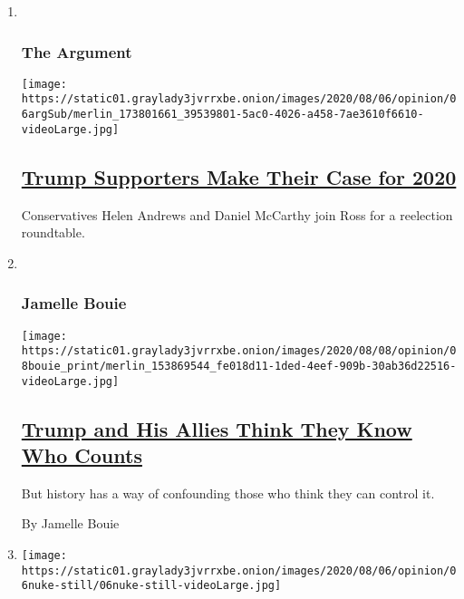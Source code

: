 \begin{enumerate}
\def\labelenumi{\arabic{enumi}.}
\item ~
  \hypertarget{the-argument}{%
  \subsubsection{The Argument}\label{the-argument}}

  \texttt{[image: https://static01.graylady3jvrrxbe.onion/images/2020/08/06/opinion/06argSub/merlin\_173801661\_39539801-5ac0-4026-a458-7ae3610f6610-videoLarge.jpg]}

  \hypertarget{trump-supporters-make-their-case-for-2020}{%
  \subsection{\texorpdfstring{\href{/2020/08/06/opinion/the-argument-trump-coronavirus-election.html}{Trump
  Supporters Make Their Case for
  2020}}{Trump Supporters Make Their Case for 2020}}\label{trump-supporters-make-their-case-for-2020}}

  Conservatives Helen Andrews and Daniel McCarthy join Ross for a
  reelection roundtable.
\item ~
  \hypertarget{jamelle-bouie}{%
  \subsubsection{Jamelle Bouie}\label{jamelle-bouie}}

  \texttt{[image: https://static01.graylady3jvrrxbe.onion/images/2020/08/08/opinion/08bouie\_print/merlin\_153869544\_fe018d11-1ded-4eef-909b-30ab36d22516-videoLarge.jpg]}

  \hypertarget{trump-and-his-allies-think-they-know-who-counts}{%
  \subsection{\texorpdfstring{\href{/2020/08/07/opinion/trump-2020-census.html}{Trump
  and His Allies Think They Know Who
  Counts}}{Trump and His Allies Think They Know Who Counts}}\label{trump-and-his-allies-think-they-know-who-counts}}

  But history has a way of confounding those who think they can control
  it.

  By Jamelle Bouie
\item
  \texttt{[image: https://static01.graylady3jvrrxbe.onion/images/2020/08/06/opinion/06nuke-still/06nuke-still-videoLarge.jpg]}


\end{enumerate}
